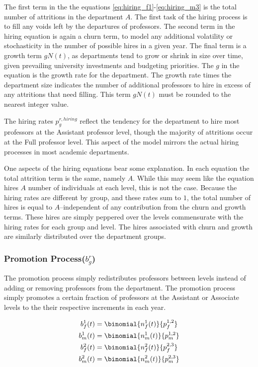 \documentclass[12pt, a4paper, oneside, headinclude, footinclude,english]{article}
\begin{document}
The first term in the the equations \ref{eq:hiring_f1}-\ref{eq:hiring_m3} is the
total number of attritions in the department $A$. The first task of the hiring
process is to fill any voids left by the departures of professors. The second
term in the hiring equation is again a churn term, to model any additional
volatility or stochasticity in the number of possible hires in a given year. The
final term is a growth term $gN(t)$, as departments tend to grow or shrink in
size over time, given prevailing university investments and budgeting
priorities. The $g$ in the equation is the growth rate for the department. The
growth rate times the department size indicates the number of additional
professors to hire in excess of any attritions that need filling. This term
$gN(t)$ must be rounded to the nearest integer value.

The hiring rates $p^{r, hiring}_g$ reflect the tendency for the department to
hire most professors at the Assistant professor level, though the majority of
attritions occur at the Full professor level. This aspect of the model mirrors
the actual hiring processes in most academic departments.

One aspects of the hiring equations bear some explanation. In each equation the
total attrition term is the same, namely $A$. While this may seem like the
equation hires $A$ number of individuals at each level, this is not the case.
Because the hiring rates are different by group, and these rates sum to $1$, the
total number of hires is equal to $A$--independent of any contribution from the
churn and growth terms. These hires are simply peppered over the levels
commensurate with the hiring rates for each group and level. The hires
associated with churn and growth are similarly distributed over the department
groups. 

\subsubsection{Promotion Process($b^r_g$)}
\label{sec:promotion}

The promotion process simply redistributes professors between levels instead of
adding or removing professors from the department. The promotion process simply
promotes a certain fraction of professors at the Assistant or Associate levels
to the their respective increments in each year.

\begin{align}
  b^1_f(t) &= \binomial{n^1_f(t)}{p^{1,2}_f}  \label{eq:attr_f1}\\
  b^1_m(t) &= \binomial{n^1_m(t)}{p^{1, 2}_m}  \label{eq:attr_m1} \\
  b^2_f(t) &= \binomial{n^2_f(t)}{p^{2, 3}_f}  \label{eq:attr_f2} \\
  b^2_m(t) &= \binomial{n^2_m(t)}{p^{2, 3}_m}  \label{eq:attr_m2}
\end{align}
\end{document}
